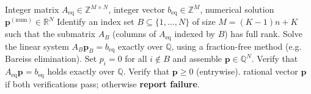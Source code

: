 \documentclass[pdflatex,sn-nature]{sn-jnl}%
\theoremstyle{thmstyleone}%
\theoremstyle{thmstyletwo}%
\theoremstyle{thmstylethree}%
\begin{document}
\begin{appendices}
\begin{algorithm}[t]
    \caption{Exact BFS reconstruction}
    \label{alg:exactbfs-supp}
    \begin{algorithmic}[1]
        \Require Integer matrix $A_{\mathrm{eq}} \in \mathbb Z^{M\times N}$,
                 integer vector $b_{\mathrm{eq}}\in\mathbb Z^M$,
                 numerical solution $\mathbf{p}^{(\mathrm{num})}\in\mathbb R^N$
        \State Identify an index set $B\subseteq\{1,\dots,N\}$ of size $M=(K-1)n+K$ such that the submatrix $A_B$ (columns of $A_{\mathrm{eq}}$ indexed by $B$) has full rank.
        \State Solve the linear system
               $A_B \mathbf{p}_{B}=b_{\mathrm{eq}}$
               exactly over $\mathbb Q$, using a fraction-free method (e.g. Bareiss elimination).
        \State Set $p_i=0$ for all $i\notin B$ and assemble $\mathbf p\in\mathbb Q^N$.
        \State Verify that $A_{\mathrm{eq}}\mathbf{p}=b_{\mathrm{eq}}$ holds exactly over $\mathbb Q$.
        \State Verify that $\mathbf{p}\ge 0$ (entrywise).
        \State \Return rational vector $\mathbf{p}$ if both verifications pass; otherwise \textbf{report failure}.
    \end{algorithmic}
\end{algorithm}


\end{appendices}
\end{document}
